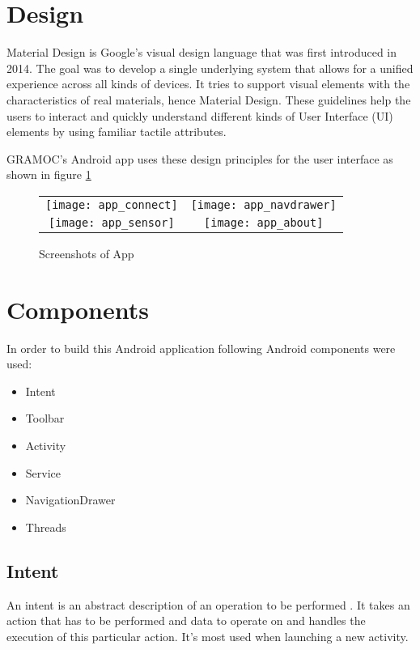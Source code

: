 \section{Design}
Material Design is Google's visual design language that was first introduced in 2014. The goal was to develop a single underlying system that allows for a unified experience across all kinds of devices. It tries to support visual elements with the characteristics of real materials, hence Material Design. These guidelines help the users to interact and quickly understand different kinds of User Interface (UI) elements by using familiar tactile attributes.

GRAMOC's Android app uses these design principles for the user interface as shown in figure \ref{fig:appscreenshots}

\begin{figure}[H]
	\centering
	\begin{tabular}{cc}
	\texttt{[image: app\_connect]}
	&
	\texttt{[image: app\_navdrawer]}
	\\
	\texttt{[image: app\_sensor]}
	&
	\texttt{[image: app\_about]}
	\end{tabular}
	\caption{Screenshots of App}
	\label{fig:appscreenshots}
\end{figure}

\section{Components}
In order to build this Android application following Android components were used:

\begin{itemize}
	\item Intent
	\item Toolbar
	\item Activity
	\item Service
	\item NavigationDrawer
	\item Threads
\end{itemize}

\subsection{Intent}
An intent is an abstract description of an operation to be performed \cite{AndroidIntent}. It takes an action that has to be performed and data to operate on and handles the execution of this particular action. It's most used when launching a new activity.

